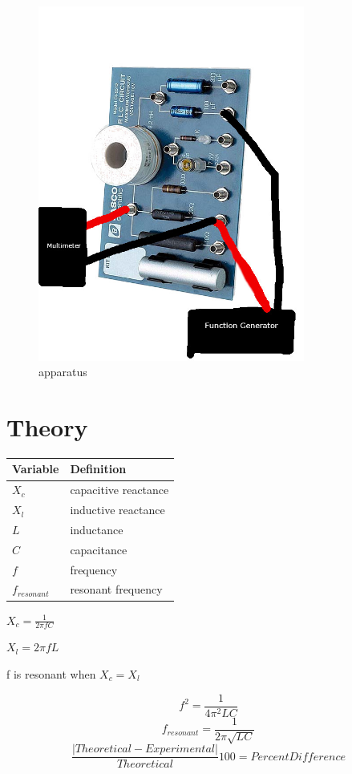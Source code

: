 \documentclass[letterpaper, 12pt]{article}
\begin{document}
\begin{figure}[H]
    \centering
    \includegraphics[height=4.6in]{rlc circuit}
    \caption{apparatus}
    \label{fig: rlc circuit}
\end{figure}

\section*{Theory}

\begin{table}[H]
\begin{tabular}{|l|l|}
\hline
\textbf{Variable} & \textbf{Definition} \\
    \hline
    $X_c$ & capacitive reactance \\
    \hline
    $X_l$ & inductive reactance \\
    \hline
    $L$ & inductance \\
    \hline
    $C$ & capacitance \\
    \hline
    $f$ & frequency \\
    \hline
    $f_{resonant}$ & resonant frequency \\
    \hline
\end{tabular}
\end{table}

\begin{center}

$X_c = \frac{1}{2 \pi f C}$

$X_l = 2 \pi f L$
\linebreak

f is resonant when $X_c = X_l$

\begin{equation}
    f^2 = \frac{1}{4 \pi^2 L C}
\end{equation}
\begin{equation}
    f_{resonant} = \frac{1}{2 \pi \sqrt{L C}}
\end{equation}
\begin{equation}
    \frac{|Theoretical - Experimental|}{Theoretical}100 = Percent Difference
\end{equation}
\end{center}
\end{document}
